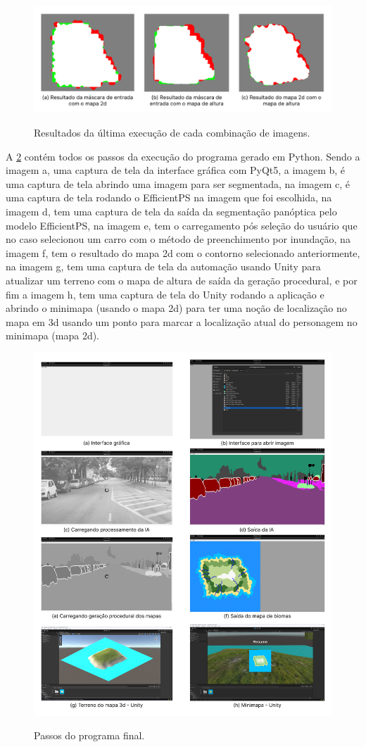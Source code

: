 \begin{figure}[!ht]
	\centering
    \caption{Resultados da última execução de cada combinação de imagens.}
	\includegraphics[width=\textwidth]{figures/comb_results_final.png}
	\label{fig:result_final}
\end{figure}

A \cref{fig:combs_result} contém todos os passos da execução do programa gerado em Python. Sendo a imagem a, uma captura de tela da interface gráfica com PyQt5, a imagem b, é uma captura de tela abrindo uma imagem para ser segmentada, na imagem c, é uma captura de tela rodando o EfficientPS na imagem que foi escolhida, na imagem d, tem uma captura de tela da saída da segmentação panóptica pelo modelo EfficientPS, na imagem e, tem o carregamento pós seleção do usuário que no caso selecionou um carro com o método de preenchimento por inundação, na imagem f, tem o resultado do mapa 2d com o contorno selecionado anteriormente, na imagem g, tem uma captura de tela da automação usando Unity para atualizar um terreno com o mapa de altura de saída da geração procedural, e por fim a imagem h, tem uma captura de tela do Unity rodando a aplicação e abrindo o minimapa (usando o mapa 2d) para ter uma noção de localização no mapa em 3d usando um ponto para marcar a localização atual do personagem no minimapa (mapa 2d).

\begin{figure}[!ht]
	\centering
    \caption{Passos do programa final.}
	\includegraphics[width=\textwidth]{figures/result_final.png}
	\label{fig:combs_result}
\end{figure}